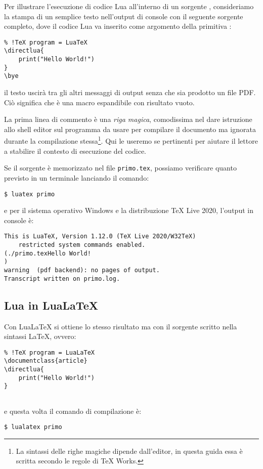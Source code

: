 Per illustrare l'esecuzione di codice Lua all'interno di un sorgente \LuaTeX,
consideriamo la stampa di un semplice testo nell'output di console con il
seguente sorgente completo, dove il codice Lua va inserito come argomento della
primitiva :
\begin{Verbatim}
% !TeX program = LuaTeX
\directlua{
    print("Hello World!")
}
\bye
\end{Verbatim}
il testo uscirà tra gli altri messaggi di output senza che sia prodotto un file
PDF. Ciò significa che  è una macro espandibile con risultato
vuoto.

La prima linea di commento è una \emph{riga magica}, comodissima nel dare
istruzione allo shell editor sul programma da usare per compilare il documento
ma ignorata durante la compilazione stessa\footnote{La sintassi delle righe
magiche dipende dall'editor, in questa guida essa è scritta secondo le regole
di TeX Works.}. Qui le useremo se pertinenti per aiutare il lettore a
stabilire il contesto di esecuzione del codice.

Se il sorgente è memorizzato nel file \texttt{primo.tex}, possiamo verificare
quanto previsto in un terminale lanciando il comando:
\begin{Verbatim}
$ luatex primo
\end{Verbatim}
e per il sistema operativo Windows e la distribuzione TeX Live 2020, l'output
in console è:
\begin{Verbatim}
This is LuaTeX, Version 1.12.0 (TeX Live 2020/W32TeX) 
    restricted system commands enabled.
(./primo.texHello World!
)
warning  (pdf backend): no pages of output.
Transcript written on primo.log.
\end{Verbatim}


\subsection{Lua in Lua\LaTeX}
\label{secLuaInLuaLaTeX}

Con Lua\LaTeX{} si ottiene lo stesso risultato ma con il sorgente scritto nella
sintassi \LaTeX, ovvero:
\begin{Verbatim}
% !TeX program = LuaLaTeX
\documentclass{article}
\directlua{
    print("Hello World!")
}


\end{Verbatim}
e questa volta il comando di compilazione è:
\begin{Verbatim}
$ lualatex primo
\end{Verbatim}

